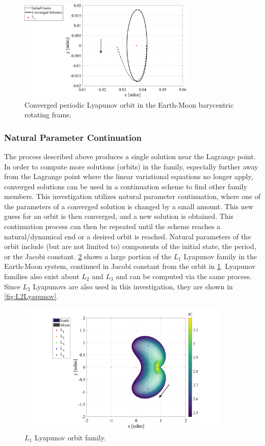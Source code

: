 \begin{figure}[ht]
    \centering
    \includegraphics[width=0.75\textwidth]{figures/Lyapunov.pdf}
    \caption{Converged periodic Lyapunov orbit in the Earth-Moon barycentric rotating frame.}
    \label{fig:Lyapunov}
\end{figure}

\subsubsection{Natural Parameter Continuation}
The process described above produces a single solution near the Lagrange point. In order to compute
more solutions (orbits) in the family, especially further away from the Lagrange point where the
linear variational equations no longer apply, converged solutions can be used in a continuation
scheme to find other family members. This investigation utilizes natural parameter continuation,
where one of the parameters of a converged solution is changed by a small amount. This new guess
for an orbit is then converged, and a new solution is obtained. This continuation process can then
be repeated until the scheme reaches a natural/dynamical end or a desired orbit is reached. Natural
parameters of the orbit include (but are not limited to) components of the initial state, the
period, or the Jacobi constant. \cref{fig:L1Lyapunov} shows a large portion of the $L_{1}$ Lyapunov
family in the Earth-Moon system, continued in Jacobi constant from the orbit in
\cref{fig:Lyapunov}. Lyapunov families also exist about $L_{2}$ and $L_{3}$ and can be computed via
the same process. Since $L_{2}$ Lyapunovs are also used in this investigation, they are shown in
\cref{fig:L2Lyapunov}.

\begin{figure}[ht]
    \centering
    \includegraphics[width=0.9\textwidth]{figures/L1LyapunovFamily.pdf}
    \caption{$L_{1}$ Lyapunov orbit family.}
    \label{fig:L1Lyapunov}
\end{figure}

